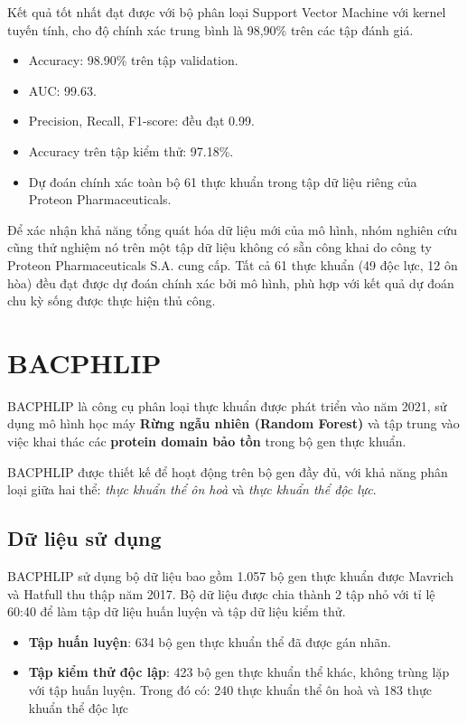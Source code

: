 Kết quả tốt nhất đạt được với bộ phân loại Support Vector Machine với kernel tuyến tính, cho độ chính xác trung bình là 98,90\% trên các tập đánh giá.
    \begin{itemize}
        \item Accuracy: 98.90\% trên tập validation.
        \item AUC: 99.63.
        \item Precision, Recall, F1-score: đều đạt 0.99.
        \item Accuracy trên tập kiểm thử: 97.18\%.
        \item Dự đoán chính xác toàn bộ 61 thực khuẩn trong tập dữ liệu riêng của Proteon Pharmaceuticals.
    \end{itemize}

Để xác nhận khả năng tổng quát hóa dữ liệu mới của mô hình, nhóm nghiên cứu cũng thử nghiệm nó trên một tập dữ liệu không có sẵn công khai do công ty Proteon Pharmaceuticals S.A. cung cấp. Tất cả 61 thực khuẩn (49 độc lực, 12 ôn hòa) đều đạt được dự đoán chính xác bởi mô hình, phù hợp với kết quả dự đoán chu kỳ sống được thực hiện thủ công.

\section{BACPHLIP}

BACPHLIP \cite{hockenberry2021bacphlip} là công cụ phân loại thực khuẩn được phát triển vào năm 2021, sử dụng mô hình học máy \textbf{Rừng ngẫu nhiên (Random Forest)} và tập trung vào việc khai thác các \textbf{protein domain bảo tồn} trong bộ gen thực khuẩn. 

BACPHLIP được thiết kế để hoạt động trên bộ gen đầy đủ, với khả năng phân loại giữa hai thể: \textit{thực khuẩn thể ôn hoà} và \textit{thực khuẩn thể độc lực}.

\subsection*{Dữ liệu sử dụng}
BACPHLIP sử dụng bộ dữ liệu bao gồm 1.057 bộ gen thực khuẩn được Mavrich và Hatfull thu thập năm 2017. Bộ dữ liệu được chia thành 2 tập nhỏ với tỉ lệ 60:40 để làm tập dữ liệu huấn luyện và tập dữ liệu kiểm thử. 
\begin{itemize}
    \item \textbf{Tập huấn luyện}: 634 bộ gen thực khuẩn thể đã được gán nhãn.
    \item \textbf{Tập kiểm thử độc lập}: 423 bộ gen thực khuẩn thể khác, không trùng lặp với tập huấn luyện. Trong đó có: 240 thực khuẩn thể ôn hoà và 183 thực khuẩn thể độc lực
\end{itemize}


